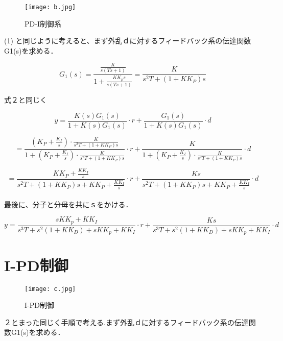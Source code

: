 \documentclass[xelatex,ja=standard,jafont=noto]{bxjsarticle}
\begin{document}
	\begin{figure}[h!]
    \centering
    \texttt{[image: b.jpg]}
    \caption{PD-I制御系}
\end{figure}

(1) と同じように考えると、まず外乱ｄに対するフィードバック系の伝達関数G1(s)を求める．

\begin{equation}
    G_{1}(s)=\frac{\frac{K}{s(Ts+1)}}{1+\frac{KK_{p}s}{s(Ts+1)}}=\frac{K}{s^{2}T+(1+KK_{P})s}
\end{equation}

式２と同じく

\begin{equation}
    y=\frac{K(s)G_{1}(s)}{1+K(s)G_{1}(s)}\cdot r+\frac{G_{1}(s)}{1+K(s)G_{1}(s)}\cdot d
\end{equation}

\begin{equation}
    =\frac{(K_{P}+\frac{K_{I}}{s})\cdot\frac{K}{s^{2}T+(1+KK_{P})s}}{1+(K_{P}+\frac{K_{I}}{s})\cdot\frac{K}{s^{2}T+(1+KK_{P})s}}\cdot r+\frac{K}{1+(K_{P}+\frac{K_{I}}{s})\cdot\frac{K}{s^{2}T+(1+KK_{P})s}}\cdot d
\end{equation}

\begin{equation}
    =\frac{KK_{P}+\frac{KK_{I}}{s}}{s^{2}T+(1+KK_{P})s+KK_{P}+\frac{KK_{I}}{s}}\cdot r+\frac{Ks}{s^{2}T+(1+KK_{P})s+KK_{P}+\frac{KK_{I}}{s}}\cdot d
\end{equation}\\

最後に、分子と分母を共にｓをかける．

\begin{equation}
    y=\frac{sKK_{p}+KK_{I}}{s^{3}T+s^{2}(1+KK_{D})+sKK_{p}+KK_{I}}\cdot r+\frac{Ks}{s^{3}T+s^{2}(1+KK_{D})+sKK_{p}+KK_{I}}\cdot d
\end{equation}

\newpage

\section{I-PD制御}

\begin{figure}[h!]
    \centering
    \texttt{[image: c.jpg]}
    \caption{I-PD制御}
\end{figure}

２とまった同じく手順で考える.まず外乱ｄに対するフィードバック系の伝達関数G1(s)を求める．
\end{document}
